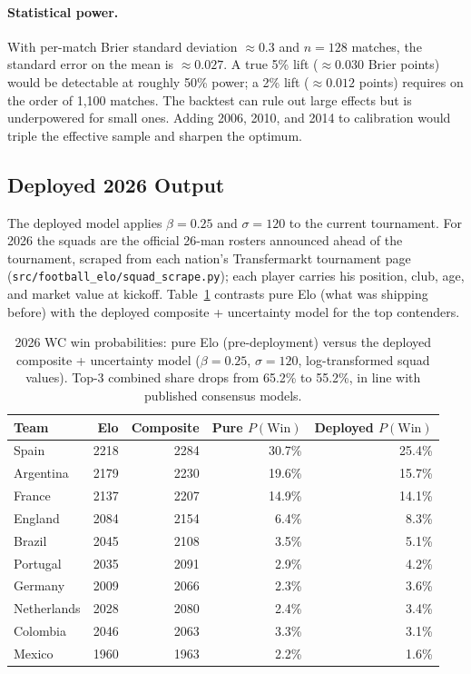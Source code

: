 \documentclass[11pt]{article}
\begin{document}
\paragraph{Statistical power.} With per-match Brier standard deviation $\approx 0.3$ and $n = 128$ matches, the standard error on the mean is $\approx 0.027$. A true 5\% lift ($\approx 0.030$ Brier points) would be detectable at roughly 50\% power; a 2\% lift ($\approx 0.012$ points) requires on the order of 1{,}100 matches. The backtest can rule out large effects but is underpowered for small ones. Adding 2006, 2010, and 2014 to calibration would triple the effective sample and sharpen the optimum.

\subsection{Deployed 2026 Output}

The deployed model applies $\beta = 0.25$ and $\sigma = 120$ to the current tournament. For 2026 the squads are the official 26-man rosters announced ahead of the tournament, scraped from each nation's Transfermarkt tournament page (\texttt{src/football\_elo/squad\_scrape.py}); each player carries his position, club, age, and market value at kickoff. Table~\ref{tab:composite2026} contrasts pure Elo (what was shipping before) with the deployed composite + uncertainty model for the top contenders.

\begin{table}[h]
\centering
\begin{tabular}{@{}lrrrr@{}}
\toprule
Team & Elo & Composite & Pure $P(\text{Win})$ & Deployed $P(\text{Win})$ \\
\midrule
Spain     & 2218 & 2284 & 30.7\% & 25.4\% \\
Argentina & 2179 & 2230 & 19.6\% & 15.7\% \\
France    & 2137 & 2207 & 14.9\% & 14.1\% \\
England   & 2084 & 2154 & 6.4\%  & 8.3\%  \\
Brazil    & 2045 & 2108 & 3.5\%  & 5.1\%  \\
Portugal  & 2035 & 2091 & 2.9\%  & 4.2\%  \\
Germany   & 2009 & 2066 & 2.3\%  & 3.6\%  \\
Netherlands & 2028 & 2080 & 2.4\% & 3.4\% \\
Colombia  & 2046 & 2063 & 3.3\%  & 3.1\%  \\
Mexico    & 1960 & 1963 & 2.2\%  & 1.6\%  \\
\bottomrule
\end{tabular}
\caption{2026 WC win probabilities: pure Elo (pre-deployment) versus the deployed composite + uncertainty model ($\beta = 0.25$, $\sigma = 120$, log-transformed squad values). Top-3 combined share drops from 65.2\% to 55.2\%, in line with published consensus models.}
\label{tab:composite2026}
\end{table}
\end{document}
